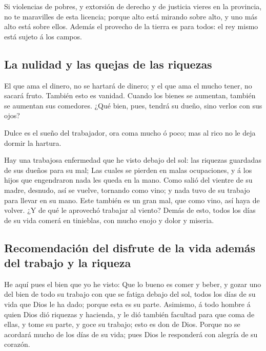  Si violencias de pobres, y extorsión de derecho y de
justicia vieres en la provincia, no te maravilles de esta licencia;
porque alto está mirando sobre alto, y uno más alto está sobre ellos.
 Además el provecho de la tierra es para todos: el rey
mismo está sujeto á los campos.

\hypertarget{la-nulidad-y-las-quejas-de-las-riquezas}{%
\subsection{La nulidad y las quejas de las
riquezas}\label{la-nulidad-y-las-quejas-de-las-riquezas}}

 El que ama el dinero, no se hartará de dinero; y el que
ama el mucho tener, no sacará fruto. También esto es vanidad.
 Cuando los bienes se aumentan, también se aumentan sus
comedores. ¿Qué bien, pues, tendrá su dueño, sino verlos con sus ojos?

 Dulce es el sueño del trabajador, ora coma mucho ó poco;
mas al rico no le deja dormir la hartura.

 Hay una trabajosa enfermedad que he visto debajo del
sol: las riquezas guardadas de sus dueños para su mal; 
Las cuales se pierden en malas ocupaciones, y á los hijos que
engendraron nada les queda en la mano.  Como salió del
vientre de su madre, desnudo, así se vuelve, tornando como vino; y nada
tuvo de su trabajo para llevar en su mano.  Este también
es un gran mal, que como vino, así haya de volver. ¿Y de qué le
aprovechó trabajar al viento?  Demás de esto, todos los
días de su vida comerá en tinieblas, con mucho enojo y dolor y miseria.

\hypertarget{recomendaciuxf3n-del-disfrute-de-la-vida-ademuxe1s-del-trabajo-y-la-riqueza}{%
\subsection{Recomendación del disfrute de la vida además del trabajo y
la
riqueza}\label{recomendaciuxf3n-del-disfrute-de-la-vida-ademuxe1s-del-trabajo-y-la-riqueza}}

 He aquí pues el bien que yo he visto: Que lo bueno es
comer y beber, y gozar uno del bien de todo su trabajo con que se fatiga
debajo del sol, todos los días de su vida que Dios le ha dado; porque
esta es su parte.  Asimismo, á todo hombre á quien Dios
dió riquezas y hacienda, y le dió también facultad para que coma de
ellas, y tome su parte, y goce su trabajo; esto es don de Dios.
 Porque no se acordará mucho de los días de su vida; pues
Dios le responderá con alegría de su corazón.

